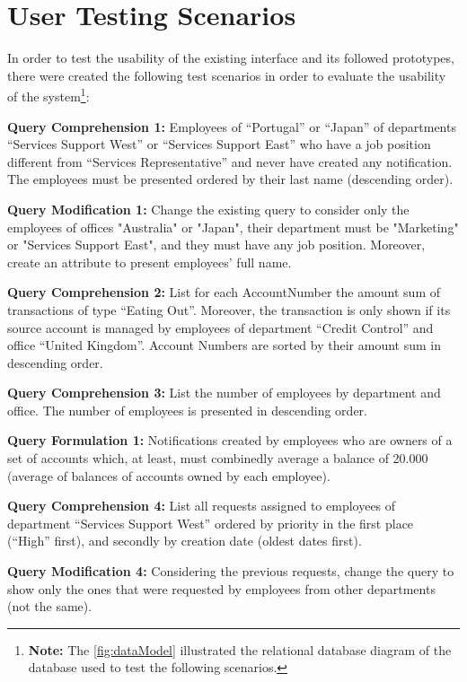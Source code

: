 \chapter{User Testing Scenarios}
\label{app:user_testing_scenarios}

In order to test the usability of the existing interface and its followed prototypes, there were created the following test scenarios in order to evaluate the usability of the system\footnote{\textbf{Note: }The \ref{fig:dataModel} illustrated the relational database diagram of the database used to test the following scenarios.}:

\medskip

\textbf{Query Comprehension 1: }Employees of “Portugal” or “Japan” of departments “Services Support West” or “Services Support East” who have a job position different from “Services Representative” and never have created any notification. The employees must be presented ordered by their last name (descending order).

\medskip

\textbf{Query Modification 1: }Change the existing query to consider only the employees of offices "Australia" or "Japan", their department must be "Marketing" or "Services Support East", and they must have any job position. Moreover, create an attribute to present employees’ full name.

\medskip

\textbf{Query Comprehension 2: }List for each AccountNumber the amount sum of transactions of type “Eating Out”. Moreover, the transaction is only shown if its source account is managed by employees of department “Credit Control” and office “United Kingdom”. Account Numbers are sorted by their amount sum in descending order.

\medskip

\textbf{Query Comprehension 3: }List the number of employees by department and office. The number of employees is presented in descending order.

\medskip

\textbf{Query Formulation 1: }Notifications created by employees who are owners of a set of accounts which, at least, must combinedly average a balance of 20.000 (average of balances of accounts owned by each employee).

\medskip

\textbf{Query Comprehension 4: }List all requests assigned to employees of department “Services Support West” ordered by priority in the first place (“High” first), and secondly by creation date (oldest dates first).

\medskip

\textbf{Query Modification 4: }Considering the previous requests, change the query to show only the ones that were requested by employees from other departments (not the same).


